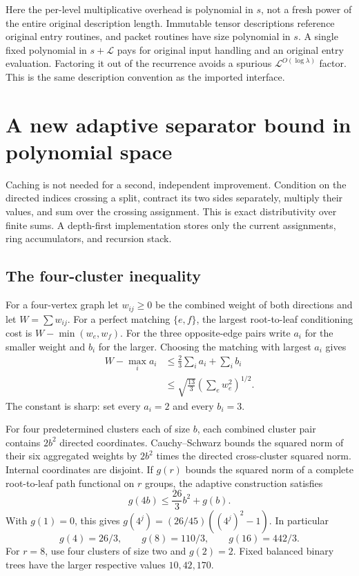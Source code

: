 \documentclass[11pt,letterpaper]{article}
\theoremstyle{remark}\newtheorem{remark}[theorem]{Remark}
\begin{document}
Here the per-level multiplicative overhead is polynomial in $s$, not a
fresh power of the entire original description length. Immutable tensor
descriptions reference original entry routines, and packet routines have
size polynomial in $s$. A single fixed polynomial in $s+\mathcal L$ pays
for original input handling and an original entry evaluation. Factoring
it out of the recurrence avoids a spurious $\mathcal L^{O(\log\lambda)}$
factor. This is the same description convention as the imported interface.

\section{A new adaptive separator bound in polynomial space}
\label{sec:ps}

Caching is not needed for a second, independent improvement. Condition on
the directed indices crossing a split, contract its two sides separately,
multiply their values, and sum over the crossing assignment. This is exact
distributivity over finite sums. A depth-first implementation stores only
the current assignments, ring accumulators, and recursion stack.

\subsection{The four-cluster inequality}

For a four-vertex graph let $w_{ij}\ge0$ be the combined weight of both
directions and let $W=\sum w_{ij}$. For a perfect matching $\{e,f\}$,
the largest root-to-leaf conditioning cost is $W-\min(w_e,w_f)$.
For the three opposite-edge pairs write $a_i$ for the smaller weight and
$b_i$ for the larger. Choosing the matching with largest $a_i$ gives
\begin{align*}
 W-\max_i a_i
 &\le \tfrac23\sum_i a_i+\sum_i b_i\\
 &\le\sqrt{\tfrac{13}3}\left(\sum_e w_e^2\right)^{1/2}.
\end{align*}
The constant is sharp: set every $a_i=2$ and every $b_i=3$.

For four predetermined clusters each of size $b$, each combined cluster
pair contains $2b^2$ directed coordinates. Cauchy--Schwarz bounds the
squared norm of their six aggregated weights by $2b^2$ times the directed
cross-cluster squared norm. Internal coordinates are disjoint. If $g(r)$
bounds the squared norm of a complete root-to-leaf path functional on
$r$ groups, the adaptive construction satisfies
\begin{equation}\label{eq:g-recurrence}
 g(4b)\le\frac{26}{3}b^2+g(b).
\end{equation}
With $g(1)=0$, this gives
$g(4^j)=(26/45)((4^j)^2-1)$. In particular
\[
 g(4)=26/3,\qquad g(8)=110/3,\qquad g(16)=442/3.
\]
For $r=8$, use four clusters of size two and $g(2)=2$.
Fixed balanced binary trees have the larger respective values
$10,42,170$.
\end{document}

